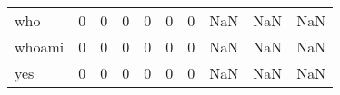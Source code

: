 \begin{longtable}{lrrrrrrrrr}
who       &                                       0 &                                                  0 &                                                  0 &                                                  0 &                                                  0 &                                                  0 &                                                NaN &                                    NaN &                                  NaN \\
whoami    &                                       0 &                                                  0 &                                                  0 &                                                  0 &                                                  0 &                                                  0 &                                                NaN &                                    NaN &                                  NaN \\
yes       &                                       0 &                                                  0 &                                                  0 &                                                  0 &                                                  0 &                                                  0 &                                                NaN &                                    NaN &                                  NaN \\
\end{longtable}
